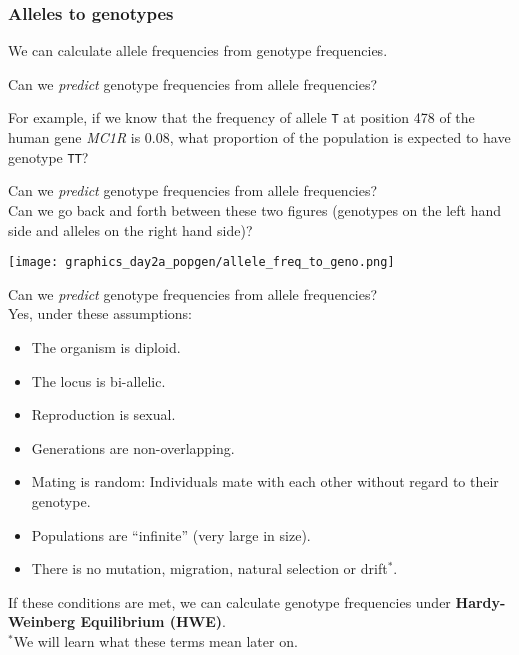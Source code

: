 \documentclass{beamer}
\newcommand{\1}{\ensuremath{\mathbf{1}}}
\begin{document}
\begin{frame}\frametitle{Alleles to genotypes}
	We can calculate allele frequencies from genotype frequencies.
	\begin{block}{}
		Can we \emph{predict} genotype frequencies from allele frequencies?
	\end{block}
	For example, if we know that the frequency of allele \texttt{T} at position 478 of the human gene \emph{MC1R} is 0.08, what proportion of the population is expected to have genotype \texttt{TT}?
\end{frame}
%
%
%
\begin{frame}
	Can we \emph{predict} genotype frequencies from allele frequencies?\\
	Can we go back and forth between these two figures (genotypes on the left hand side and alleles on the right hand side)?
	\begin{center}
		\texttt{[image: graphics\_day2a\_popgen/allele\_freq\_to\_geno.png]}
	\end{center}
\end{frame}
%
%
%
\begin{frame}
	Can we \emph{predict} genotype frequencies from allele frequencies?\\
	Yes, under these assumptions:
	\begin{itemize}
		\item The organism is diploid.
		\item The locus is bi-allelic.
		\item Reproduction is sexual.
		\item Generations are non-overlapping.
		\item Mating is random: Individuals mate with each other without regard to their genotype.
		\item Populations are ``infinite'' (very large in size).
		\item There is no mutation, migration, natural selection or drift$^{*}$.
	\end{itemize}
	If these conditions are met, we can calculate genotype frequencies under \textbf{Hardy-Weinberg Equilibrium (HWE)}.\\[1.5ex]
	{\scriptsize $^{*}$We will learn what these terms mean later on.}
\end{frame}
\end{document}

